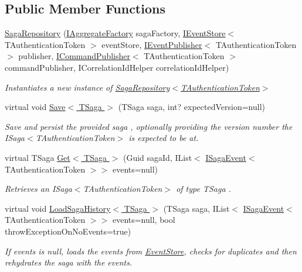 \subsection*{Public Member Functions}
\begin{DoxyCompactItemize}
\item 
\hyperlink{classCqrs_1_1Domain_1_1SagaRepository_ab444c7f3ace1ee0350d9f396345c395d_ab444c7f3ace1ee0350d9f396345c395d}{Saga\+Repository} (\hyperlink{interfaceCqrs_1_1Domain_1_1Factories_1_1IAggregateFactory}{I\+Aggregate\+Factory} saga\+Factory, \hyperlink{interfaceCqrs_1_1Events_1_1IEventStore}{I\+Event\+Store}$<$ T\+Authentication\+Token $>$ event\+Store, \hyperlink{interfaceCqrs_1_1Events_1_1IEventPublisher}{I\+Event\+Publisher}$<$ T\+Authentication\+Token $>$ publisher, \hyperlink{interfaceCqrs_1_1Commands_1_1ICommandPublisher}{I\+Command\+Publisher}$<$ T\+Authentication\+Token $>$ command\+Publisher, I\+Correlation\+Id\+Helper correlation\+Id\+Helper)
\begin{DoxyCompactList}\small\item\em Instantiates a new instance of \hyperlink{classCqrs_1_1Domain_1_1SagaRepository_ab444c7f3ace1ee0350d9f396345c395d_ab444c7f3ace1ee0350d9f396345c395d}{Saga\+Repository$<$\+T\+Authentication\+Token$>$} \end{DoxyCompactList}\item 
virtual void \hyperlink{classCqrs_1_1Domain_1_1SagaRepository_a84cae424cb01de22864ae7d960007cd0_a84cae424cb01de22864ae7d960007cd0}{Save$<$ T\+Saga $>$} (T\+Saga saga, int? expected\+Version=null)
\begin{DoxyCompactList}\small\item\em Save and persist the provided {\itshape saga} , optionally providing the version number the I\+Saga$<$\+T\+Authentication\+Token$>$ is expected to be at. \end{DoxyCompactList}\item 
virtual T\+Saga \hyperlink{classCqrs_1_1Domain_1_1SagaRepository_a1b80ecc2a5719d1681ca5d182a252120_a1b80ecc2a5719d1681ca5d182a252120}{Get$<$ T\+Saga $>$} (Guid saga\+Id, I\+List$<$ \hyperlink{interfaceCqrs_1_1Events_1_1ISagaEvent}{I\+Saga\+Event}$<$ T\+Authentication\+Token $>$$>$ events=null)
\begin{DoxyCompactList}\small\item\em Retrieves an I\+Saga$<$\+T\+Authentication\+Token$>$ of type {\itshape T\+Saga} . \end{DoxyCompactList}\item 
virtual void \hyperlink{classCqrs_1_1Domain_1_1SagaRepository_af6af9066681e47bc4ff2e14358321fb8_af6af9066681e47bc4ff2e14358321fb8}{Load\+Saga\+History$<$ T\+Saga $>$} (T\+Saga saga, I\+List$<$ \hyperlink{interfaceCqrs_1_1Events_1_1ISagaEvent}{I\+Saga\+Event}$<$ T\+Authentication\+Token $>$$>$ events=null, bool throw\+Exception\+On\+No\+Events=true)
\begin{DoxyCompactList}\small\item\em If {\itshape events}  is null, loads the events from \hyperlink{namespaceCqrs_1_1EventStore}{Event\+Store}, checks for duplicates and then rehydrates the {\itshape saga}  with the events. \end{DoxyCompactList}\end{DoxyCompactItemize}
